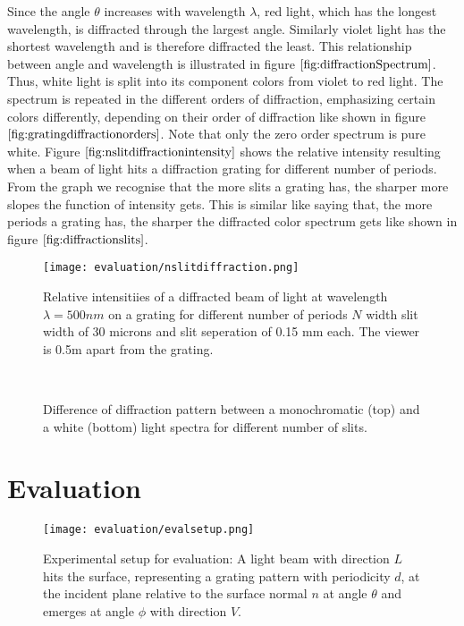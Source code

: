 Since the angle $\theta$ increases with wavelength $\lambda$, red light, which has the longest wavelength, is diffracted through the largest angle. Similarly violet light has the shortest wavelength and is therefore diffracted the least. This relationship between angle and wavelength is illustrated in figure $\ref{fig:diffractionSpectrum}$. Thus, white light is split into its component colors from violet to red light. The spectrum is repeated in the different orders of diffraction, emphasizing certain colors differently, depending on their order of diffraction like shown in figure $\ref{fig:gratingdiffractionorders}$. Note that only the zero order spectrum is pure white.  
Figure $\ref{fig:nslitdiffractionintensity}$ shows the relative intensity resulting when a beam of light hits a diffraction grating for different number of periods. From the graph we recognise that the more slits a grating has, the sharper more slopes the function of intensity gets. This is similar like saying that, the more periods a grating has, the sharper the diffracted color spectrum gets like shown in figure $\ref{fig:diffractionslits}$. 

\begin{figure}[H]
  \centering
  \texttt{[image: evaluation/nslitdiffraction.png]}
  \caption{Relative intensitiies of a diffracted beam of light at wavelength $\lambda=500nm$ on a grating for different number of periods $N$ width slit width of 30 microns and slit seperation of 0.15 mm each. The viewer is 0.5m apart from the grating.}
  \label{fig:nslitdiffractionintensity}
\end{figure}

\begin{figure}[H]
  \centering

~
  
  
  \caption{Difference of diffraction pattern between a monochromatic (top) and a white (bottom) light spectra for different number of slits.}
\label{fig:diffractionslits}
\end{figure}

\section{Evaluation}

\begin{figure}[H]
  \centering
  \texttt{[image: evaluation/evalsetup.png]}
  \caption{Experimental setup for evaluation: A light beam with direction $L$ hits the surface, representing a grating pattern with periodicity $d$, at the incident plane relative to the surface normal $n$ at angle $\theta$ and emerges at angle $\phi$ with direction $V$.}
  \label{fig:experimentalsetup}
\end{figure}


